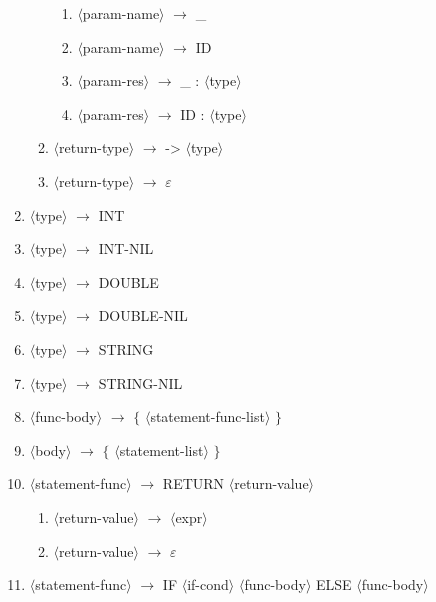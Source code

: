 \documentclass[11pt]{article}
\newcommand{\red}[1]{{\color{red} #1}}
\begin{document}
\begin{enumerate}[label=\arabic*., ref=\arabic*]
\begin{enumerate}[label=\arabic{enumi}.\arabic*., ref=\arabic{enumi}\arabic*]
\begin{enumerate}[label=\arabic{enumi}.\arabic{enumi}.\arabic*., ref=\arabic{enumi}.\arabic{enumi}.\arabic*]
            \item $\langle$param-name$\rangle$ $\rightarrow$ \red{\_}
            \item $\langle$param-name$\rangle$ $\rightarrow$ \red{ID}
            \item $\langle$param-res$\rangle$ $\rightarrow$ \red{\_ :} $\langle$type$\rangle$
            \item $\langle$param-res$\rangle$ $\rightarrow$ \red{ID :} $\langle$type$\rangle$
        \end{enumerate}
        \item $\langle$return-type$\rangle$ $\rightarrow$ \red{->} $\langle$type$\rangle$
        \item $\langle$return-type$\rangle$ $\rightarrow$ \red{$\varepsilon$}
    \end{enumerate}
    \item $\langle$type$\rangle$ $\rightarrow$ \red{INT}
    \item $\langle$type$\rangle$ $\rightarrow$ \red{INT-NIL}
    \item $\langle$type$\rangle$ $\rightarrow$ \red{DOUBLE}
    \item $\langle$type$\rangle$ $\rightarrow$ \red{DOUBLE-NIL}
    \item $\langle$type$\rangle$ $\rightarrow$ \red{STRING}
    \item $\langle$type$\rangle$ $\rightarrow$ \red{STRING-NIL}
    \item $\langle$func-body$\rangle$ $\rightarrow$ \red{$\{$} $\langle$statement-func-list$\rangle$ \red{$\}$}
    \item $\langle$body$\rangle$ $\rightarrow$ \red{$\{$} $\langle$statement-list$\rangle$ \red{$\}$}
    \item $\langle$statement-func$\rangle$ $\rightarrow$ \red{RETURN} $\langle$return-value$\rangle$
    \begin{enumerate}[label=\arabic{enumi}.\arabic*., ref=\arabic{enumi}.\arabic*]
        \item $\langle$return-value$\rangle$ $\rightarrow$ $\langle$expr$\rangle$
        \item $\langle$return-value$\rangle$ $\rightarrow$ \red{$\varepsilon$}
    \end{enumerate}
    \item $\langle$statement-func$\rangle$ $\rightarrow$ \red{IF} $\langle$if-cond$\rangle$ $\langle$func-body$\rangle$ \red{ELSE} $\langle$func-body$\rangle$
    \begin{enumerate}[label=\arabic{enumi}.\arabic*., ref=\arabic{enumi}.\arabic*]

\end{enumerate}
\end{enumerate}
\end{document}
